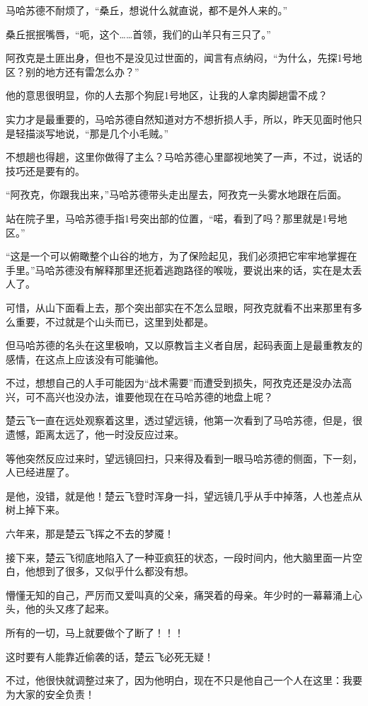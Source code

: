 马哈苏德不耐烦了，“桑丘，想说什么就直说，都不是外人来的。”

桑丘抿抿嘴唇，“呃，这个……首领，我们的山羊只有三只了。”

阿孜克是土匪出身，但也不是没见过世面的，闻言有点纳闷，“为什么，先探1号地区？别的地方还有雷怎么办？”

他的意思很明显，你的人去那个狗屁1号地区，让我的人拿肉脚趟雷不成？

实力才是最重要的，马哈苏德自然知道对方不想折损人手，所以，昨天见面时他只是轻描淡写地说，“那是几个小毛贼。”

不想趟也得趟，这里你做得了主么？马哈苏德心里鄙视地笑了一声，不过，说话的技巧还是要有的。

“阿孜克，你跟我出来，”马哈苏德带头走出屋去，阿孜克一头雾水地跟在后面。

站在院子里，马哈苏德手指1号突出部的位置，“喏，看到了吗？那里就是1号地区。”

“这是一个可以俯瞰整个山谷的地方，为了保险起见，我们必须把它牢牢地掌握在手里。”马哈苏德没有解释那里还扼着逃跑路径的喉咙，要说出来的话，实在是太丢人了。

可惜，从山下面看上去，那个突出部实在不怎么显眼，阿孜克就看不出来那里有多么重要，不过就是个山头而已，这里到处都是。

但马哈苏德的名头在这里极响，又以原教旨主义者自居，起码表面上是最重教友的感情，在这点上应该没有可能骗他。

不过，想想自己的人手可能因为“战术需要”而遭受到损失，阿孜克还是没办法高兴，可不高兴也没办法，谁要他现在在马哈苏德的地盘上呢？

楚云飞一直在远处观察着这里，透过望远镜，他第一次看到了马哈苏德，但是，很遗憾，距离太远了，他一时没反应过来。

等他突然反应过来时，望远镜回扫，只来得及看到一眼马哈苏德的侧面，下一刻，人已经进屋了。

是他，没错，就是他！楚云飞登时浑身一抖，望远镜几乎从手中掉落，人也差点从树上掉下来。

六年来，那是楚云飞挥之不去的梦魇！

接下来，楚云飞彻底地陷入了一种亚疯狂的状态，一段时间内，他大脑里面一片空白，他想到了很多，又似乎什么都没有想。

懵懂无知的自己，严厉而又爱叫真的父亲，痛哭着的母亲。年少时的一幕幕涌上心头，他的头又疼了起来。

所有的一切，马上就要做个了断了！！！

这时要有人能靠近偷袭的话，楚云飞必死无疑！

不过，他很快就调整过来了，因为他明白，现在不只是他自己一个人在这里：我要为大家的安全负责！

